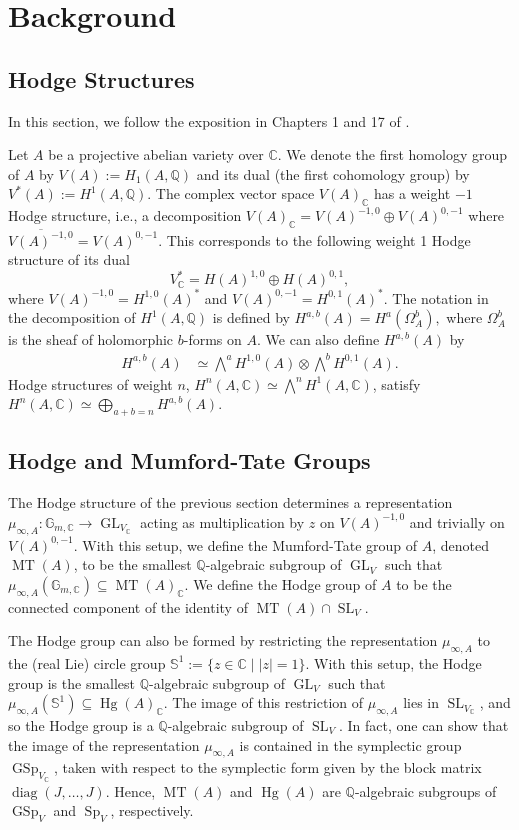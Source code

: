 \documentclass[reqno, oneside, 12pt]{amsart}
\DeclareMathOperator{\Sp}{Sp}
\DeclareMathOperator{\GSp}{GSp}
\DeclareMathOperator{\GL}{GL}
\DeclareMathOperator{\SL}{SL}
\DeclareMathOperator{\diag}{diag}
\DeclareMathOperator{\Hg}{Hg}
\DeclareMathOperator{\MT}{MT}
\newcommand{\Q}{\mathbb{Q}}
\newcommand{\C}{\mathbb{C}}
\theoremstyle{remark}
\numberwithin{equation}{section}
\begin{document}
\section{Background}\label{sec:background}

\subsection{Hodge Structures}\label{sec:backgroundHodgeStructure}

In this section, we follow the exposition in Chapters 1 and 17 of \cite{BirkenhakeLange2004}. 

Let $A$ be a projective abelian variety over $\mathbb C$. We denote the first homology group of $A$ by $V(A):=H_1(A,\Q)$ and its dual (the first cohomology group) by $V^*(A):=H^1(A,\Q)$. The complex vector space $V(A)_\C$ has a weight $-1$ Hodge structure, i.e., a decomposition $V(A)_\C= V(A)^{-1,0}\oplus V(A)^{0,-1}$ where  $\overline{V(A)^{-1,0}}=V(A)^{0,-1}$. This corresponds to the following weight 1 Hodge structure of its dual
$$V^*_\C =H(A)^{1,0}\oplus H(A)^{0,1},$$
where $V(A)^{-1,0}=H^{1,0}(A)^*$ and $V(A)^{0,-1}=H^{0,1}(A)^*$. The notation in the decomposition of $H^1(A,\Q)$ is defined by $H^{a,b}(A)=H^a(\Omega^b_A),$ where $\Omega_A^b$ is the sheaf of holomorphic $b$-forms on $A$. We can also define $H^{a,b}(A)$ by
\begin{align}\label{eqn:Hodgeab}
    H^{a,b}(A)&\simeq \bigwedge^a H^{1,0}(A) \otimes \bigwedge^b H^{0,1}(A).
\end{align}
Hodge structures of weight $n$, $H^n(A,\C)\simeq \bigwedge^n H^1(A,\C)$, satisfy $ H^n(A,\C)\simeq \bigoplus_{a+b=n} H^{a,b}(A).$


\subsection{Hodge and Mumford-Tate Groups}\label{sec:backgroundHodgeMT}


The Hodge structure of the previous section determines a representation $\mu_{\infty,A}: \mathbb G_{m,\C} \rightarrow \GL_{V_\C}$ acting as multiplication by $z$ on $V(A)^{-1,0}$ and trivially on $V(A)^{0,-1}$. 
With this setup, we define the {Mumford-Tate group} of $A$, denoted $\MT(A)$, to be the smallest $\Q$-algebraic subgroup of $\GL_{V}$  such that $\mu_{\infty,A}(\mathbb G_{m,\C})\subseteq \MT(A)_\C$. We define the Hodge group of $A$ to be the connected component of the identity of $\MT(A)\cap \SL_{V}$. 

The Hodge group can also be formed by restricting the representation $\mu_{\infty,A}$ to the (real Lie) circle group $\mathbb S^1:=\{z\in\C\mid |z|=1\}$. With this setup, the Hodge group is the smallest $\Q$-algebraic subgroup of $\GL_{V}$ such that  $\mu_{\infty,A}(\mathbb S^1)\subseteq \Hg(A)_\C$. The image of this restriction of $\mu_{\infty,A}$ lies in $\SL_{V_\C}$, and so the Hodge group is a $\Q$-algebraic subgroup of $\SL_{V}$. In fact, one can show that the image of the representation $\mu_{\infty,A}$ is contained in the symplectic group $\GSp_{V_\C}$, taken with respect to the symplectic form given by the block matrix $\diag(J,\ldots,J)$. Hence, $\MT(A)$ and $\Hg(A)$ are $\Q$-algebraic subgroups of $\GSp_{V}$ and $\Sp_{V}$, respectively.
\end{document}
